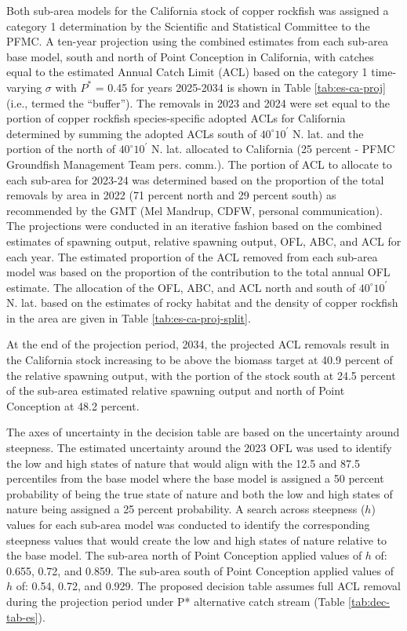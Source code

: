 \documentclass[11pt,
  letterpaper,
]{article}
\begin{document}
Both sub-area models for the California stock of copper rockfish was assigned a category 1 determination by the Scientific and Statistical Committee to the PFMC. A ten-year projection using the combined estimates from each sub-area base model, south and north of Point Conception in California, with catches equal to the estimated Annual Catch Limit (ACL) based on the category 1 time-varying \(\sigma\) with \(P^*\) = 0.45 for years 2025-2034 is shown in Table \ref{tab:es-ca-proj} (i.e., termed the ``buffer''). The removals in 2023 and 2024 were set equal to the portion of copper rockfish species-specific adopted ACLs for California determined by summing the adopted ACLs south of $40^\circ 10^\prime$ N. lat. and the portion of the north of $40^\circ 10^\prime$ N. lat. allocated to California (25 percent - PFMC Groundfish Management Team pers. comm.). The portion of ACL to allocate to each sub-area for 2023-24 was determined based on the proportion of the total removals by area in 2022 (71 percent north and 29 percent south) as recommended by the GMT (Mel Mandrup, CDFW, personal communication). The projections were conducted in an iterative fashion based on the combined estimates of spawning output, relative spawning output, OFL, ABC, and ACL for each year. The estimated proportion of the ACL removed from each sub-area model was based on the proportion of the contribution to the total annual OFL estimate. The allocation of the OFL, ABC, and ACL north and south of $40^\circ 10^\prime$ N. lat. based on the estimates of rocky habitat and the density of copper rockfish in the area are given in Table \ref{tab:es-ca-proj-split}.

At the end of the projection period, 2034, the projected ACL removals result in the California stock increasing to be above the biomass target at 40.9 percent of the relative spawning output, with the portion of the stock south at 24.5 percent of the sub-area estimated relative spawning output and north of Point Conception at 48.2 percent.

The axes of uncertainty in the decision table are based on the uncertainty around steepness. The estimated uncertainty around the 2023 OFL was used to identify the low and high states of nature that would align with the 12.5 and 87.5 percentiles from the base model where the base model is assigned a 50 percent probability of being the true state of nature and both the low and high states of nature being assigned a 25 percent probability. A search across steepness (\(h\)) values for each sub-area model was conducted to identify the corresponding steepness values that would create the low and high states of nature relative to the base model. The sub-area north of Point Conception applied values of \(h\) of: 0.655, 0.72, and 0.859. The sub-area south of Point Conception applied values of \(h\) of: 0.54, 0.72, and 0.929. The proposed decision table assumes full ACL removal during the projection period under P* alternative catch stream (Table \ref{tab:dec-tab-es}).
\end{document}

